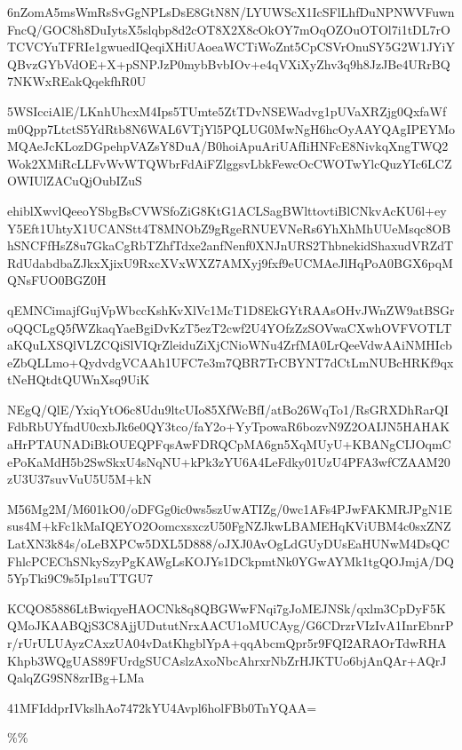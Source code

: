 \documentclass[]{article}
\newenvironment{Shaded}{\begin{snugshade}}{\end{snugshade}}
\newcommand{\NormalTok}[1]{#1}
\begin{document}
\begin{Shaded}
\begin{Highlighting}[]
\NormalTok{6nZomA5msWmRsSvGgNPLsDsE8GtN8N/LYUWScX1IcSFlLhfDuNPNWVFuwnFncQ/GOC8h8DuIytsX5slqbp8d2cOT8X2X8cOkOY7mOqOZOuOTOl7i1tDL7rOTCVCYuTFRIe1gwuedIQeqiXHiUAoeaWCTiWoZnt5CpCSVrOnuSY5G2W1JYiYQBvzGYbVdOE+X+pSNPJzP0mybBvbIOv+e4qVXiXyZhv3q9h8JzJBe4URrBQ7NKWxREakQqekfhR0U}

\NormalTok{5WSIcciAlE/LKnhUhcxM4Ips5TUmte5ZtTDvNSEWadvg1pUVaXRZjg0QxfaWfm0Qpp7LtctS5YdRtb8N6WAL6VTjYl5PQLUG0MwNgH6hcOyAAYQAgIPEYMoMQAeJcKLozDGpehpVAZsY8DuA/B0hoiApuAriUAfIiHNFcE8NivkqXngTWQ2Wok2XMiRcLLFvWvWTQWbrFdAiFZlggsvLbkFewcOcCWOTwYlcQuzYIc6LCZOWIUlZACuQjOubIZuS}

\NormalTok{ehiblXwvlQeeoYSbgBsCVWSfoZiG8KtG1ACLSagBWlttovtiBlCNkvAcKU6l+eyY5Eft1UhtyX1UCANStt4T8MNObZ9gRgeRNUEVNeRs6YhXhMhUUeMsqc8OBhSNCFfHsZ8u7GkaCgRbTZhfTdxe2anfNenf0XNJnURS2ThbnekidShaxudVRZdTRdUdabdbaZJkxXjixU9RxcXVxWXZ7AMXyj9fxf9eUCMAeJlHqPoA0BGX6pqMQNsFUO0BGZ0H}

\NormalTok{qEMNCimajfGujVpWbccKshKvXlVc1McT1D8EkGYtRAAsOHvJWnZW9atBSGroQQCLgQ5fWZkaqYaeBgiDvKzT5ezT2cwf2U4YOfzZzSOVwaCXwhOVFVOTLTaKQuLXSQlVLZCQiSlVIQrZleiduZiXjCNioWNu4ZrfMA0LrQeeVdwAAiNMHIcbeZbQLLmo+QydvdgVCAAh1UFC7e3m7QBR7TrCBYNT7dCtLmNUBcHRKf9qxtNeHQtdtQUWnXsq9UiK}

\NormalTok{NEgQ/QlE/YxiqYtO6c8Udu9ltcUIo85XfWcBfI/atBo26WqTo1/RsGRXDhRarQIFdbRbUYfndU0cxbJk6e0QY3tco/faY2o+YyTpowaR6bozvN9Z2OAIJN5HAHAKaHrPTAUNADiBkOUEQPFqsAwFDRQCpMA6gn5XqMUyU+KBANgCIJOqmCePoKaMdH5b2SwSkxU4sNqNU+kPk3zYU6A4LeFdky01UzU4PFA3wfCZAAM20zU3U37suvVuU5U5M+kN}

\NormalTok{M56Mg2M/M601kO0/oDFGg0ic0ws5szUwATIZg/0wc1AFs4PJwFAKMRJPgN1Esus4M+kFc1kMaIQEYO2OomcxsxczU50FgNZJkwLBAMEHqKViUBM4c0sxZNZLatXN3k84s/oLeBXPCw5DXL5D888/oJXJ0AvOgLdGUyDUsEaHUNwM4DsQCFhlcPCEChSNkySzyPgKAWgLsKOJYs1DCkpmtNk0YGwAYMk1tgQOJmjA/DQ5YpTki9C9s5Ip1suTTGU7}

\NormalTok{KCQO85886LtBwiqyeHAOCNk8q8QBGWwFNqi7gJoMEJNSk/qxlm3CpDyF5KQMoJKAABQjS3C8AjjUDututNrxAACU1oMUCAyg/G6CDrzrVIzIvA1InrEbnrPr/rUrULUAyzCAxzUA04vDatKhgblYpA+qqAbcmQpr5r9FQI2ARAOrTdwRHAKhpb3WQgUAS89FUrdgSUCAslzAxoNbcAhrxrNbZrHJKTUo6bjAnQAr+AQrJQalqZG9SN8zrIBg+LMa}

\NormalTok{41MFIddprIVkslhAo7472kYU4Avpl6holFBb0TnYQAA=}
\end{Highlighting}
\end{Shaded}

\%\%
\end{document}
